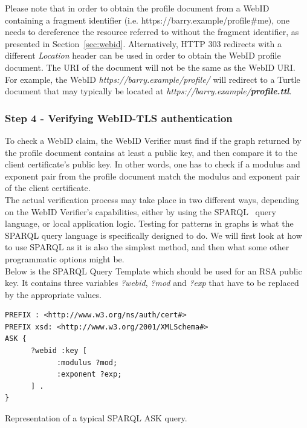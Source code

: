 Please note that in order to obtain the profile document from a WebID containing a fragment identifier (i.e. https://barry.example/profile\#me), one needs to dereference the resource referred to without the fragment identifier, as presented in Section~\ref{sec:webid}. Alternatively, HTTP 303 redirects with a different \textit{Location} header can be used in order to obtain the WebID profile document. The URI of the document will not be the same as the WebID URI. For example, the WebID \textit{https://barry.example/profile/} will redirect to a Turtle document that may typically be located at \textit{https://barry.example/\textbf{profile.ttl}}.

\subsubsection{Step 4 - Verifying WebID-TLS authentication}
To check a WebID claim, the WebID Verifier must find if the graph returned by the profile document contains at least a public key, and then compare it to the client certificate's public key. In other words, one has to check if a modulus and exponent pair from the profile document match the modulus and exponent pair of the client certificate.\\

The actual verification process may take place in two different ways, depending on the WebID Verifier's capabilities, either by using the SPARQL~\cite{prud2008sparql} query language, or local application logic. Testing for patterns in graphs is what the SPARQL query language is specifically designed to do. We will first look at how to use SPARQL as it is also the simplest method, and then what some other programmatic options might be.\\

Below is the SPARQL Query Template which should be used for an RSA public key. It contains three variables \textit{?webid}, \textit{?mod} and \textit{?exp} that have to be replaced by the appropriate values.

\begin{example}
\begin{verbatim}
PREFIX : <http://www.w3.org/ns/auth/cert#>
PREFIX xsd: <http://www.w3.org/2001/XMLSchema#>
ASK {
      ?webid :key [
            :modulus ?mod;
            :exponent ?exp;
      ] .
}
\end{verbatim}
\caption{Representation of a typical SPARQL ASK query.}
\label{ex:sparql_ask}
\end{example}


